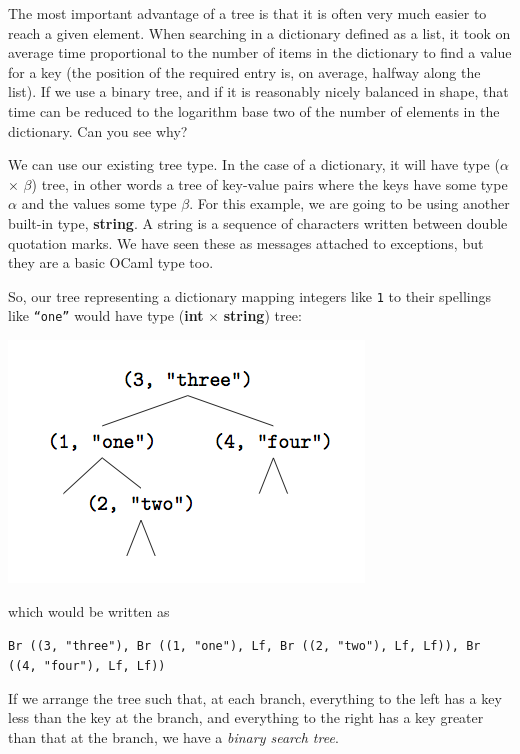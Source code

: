 \documentclass[]{book}
\newcommand{\smspace}{\vspace{4mm}}
\begin{document}
The most important advantage of a tree is that it is often very much easier to reach a given element. When searching in a dictionary defined as a list, it took on average time proportional to the number of items in the dictionary to find a value for a key (the position of the required entry is, on average, halfway along the list). If we use a binary tree, and if it is reasonably nicely balanced in shape, that time can be reduced to the logarithm base two of the number of elements in the dictionary. Can you see why?

We can use our existing \textrm{tree} type. In the case of a dictionary, it will have type \textrm{\textmd{(}$\alpha$ $\times$ $\beta$\textmd{)} tree}, in other words a tree of key-value pairs where the keys have some type \textrm{$\alpha$} and the values some type \textrm{$\beta$}. For this example, we are going to be using another built-in type, \textrm{\textbf{string}}. A string is a sequence of characters written between double quotation marks. We have seen these as messages attached to exceptions, but they are a basic OCaml type too.

So, our tree representing a dictionary mapping integers like \texttt{1} to their spellings like \texttt{``one''} would have type \textrm{\textmd{(}\textbf{int} $\times$ \textbf{string}\textmd{)} tree}:

\smspace
\includegraphics{kindlefig4.png}
\smspace

\noindent which would be written as

\smspace
{\footnotesize\texttt{Br ((3, "three"), Br ((1, "one"), Lf, Br ((2, "two"), Lf,
Lf)), Br ((4, "four"), Lf, Lf))}}
\smspace

\noindent If we arrange the tree such that, at each branch, everything to the left has a key less than the key at the branch, and everything to the right has a key greater than that at the branch, we have a \textit{binary search tree}.
\end{document}
